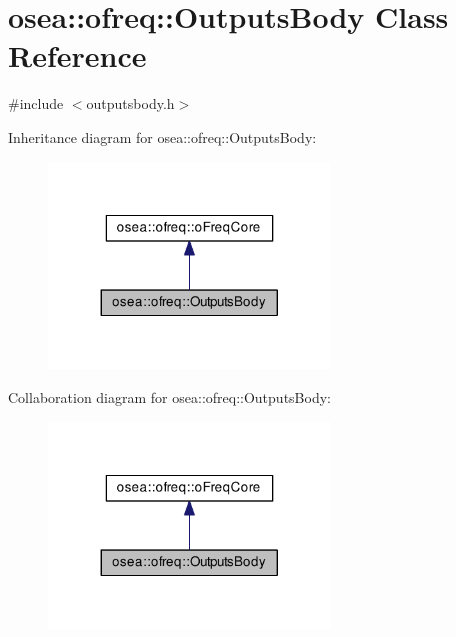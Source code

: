\hypertarget{classosea_1_1ofreq_1_1_outputs_body}{\section{osea\-:\-:ofreq\-:\-:Outputs\-Body Class Reference}
\label{classosea_1_1ofreq_1_1_outputs_body}
}


{\ttfamily \#include $<$outputsbody.\-h$>$}



Inheritance diagram for osea\-:\-:ofreq\-:\-:Outputs\-Body\-:
\nopagebreak
\begin{figure}[H]
\begin{center}
\leavevmode
\includegraphics[width=212pt]{classosea_1_1ofreq_1_1_outputs_body__inherit__graph}
\end{center}
\end{figure}


Collaboration diagram for osea\-:\-:ofreq\-:\-:Outputs\-Body\-:
\nopagebreak
\begin{figure}[H]
\begin{center}
\leavevmode
\includegraphics[width=212pt]{classosea_1_1ofreq_1_1_outputs_body__coll__graph}
\end{center}
\end{figure}
